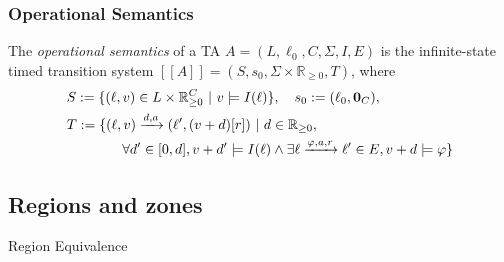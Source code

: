 \documentclass{beamer}
\theoremstyle{definition}
\begin{document}
\begin{frame}
  \frametitle{Operational Semantics}
\begin{definition}
  \small
  The \emph{operational semantics} of a TA $A = (L, \ell_0, C, \Sigma, I, E)$ is the infinite-state timed transition system $[\![A]\!] = (S, s_0, \Sigma \times \mathbb{R}_{\geq 0}, T)$, where
  \begin{align*}
	  &S := \{(\ell, v) \in L \times \mathbb{R}_{\geq 0}^C\ |\ v \models I(\ell)\}, \quad s_0 := (\ell_0, \text{\bf 0}_C),\\
	  &T := \{(\ell, v) \xrightarrow{d, a} (\ell', (v+d)[r]) \ | \ d \in \mathbb{R}_{\geq 0}, \\
    &\quad\quad\quad\quad\forall d' \in [0, d], v + d' \models I(\ell) \land \exists \ell \xrightarrow{\varphi, a, r} \ell' \in E, v + d \models \varphi \}
  \end{align*}
\end{definition}
\end{frame}

\subsection{Regions and zones}

\begin{frame}
\end{frame}

\begin{frame}{Region Equivalence}
\end{frame}
\end{document}

